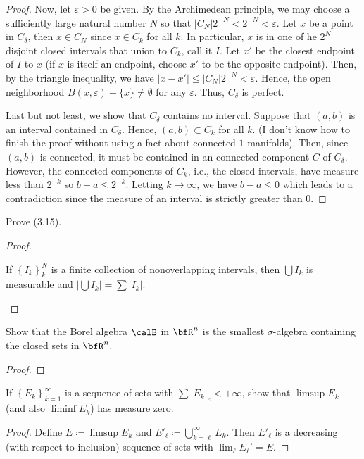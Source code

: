\begin{proof}
Now, let $\varepsilon>0$ be given. By the Archimedean
principle, we may choose a sufficiently large natural number $N$ so that
$\left|C_N\right|2^{-N}<2^{-N}<\varepsilon$. Let $x$ be a point in
$C_\delta$, then $x\in C_N$ since $x\in C_k$ for all $k$. In particular,
$x$ is in one of he $2^N$ disjoint closed intervals that union to $C_k$,
call it $I$. Let $x'$ be the closest endpoint of $I$ to $x$ (if $x$ is
itself an endpoint, choose $x'$ to be the opposite endpoint). Then, by the
triangle inequality, we have $\left|x-x'\right|\leq
\left|C_N\right|2^{-N}<\varepsilon$. Hence, the open neighborhood
$B(x,\varepsilon)\minus\{x\}\neq\emptyset$ for any $\varepsilon$. Thus,
$C_\delta$ is perfect.

Last but not least, we show that $C_\delta$ contains no interval. Suppose
that $(a,b)$ is an interval contained in $C_\delta$. Hence, $(a,b)\subset
C_k$ for all $k$. (I don't know how to finish the proof without using a
fact about connected $1$-manifolds). Then, since $(a,b)$ is connected, it
must be contained in an connected component $C$ of $C_\delta$. However, the
connected components of $C_k$, i.e., the closed intervals, have measure
less than $2^{-k}$ so $b-a\leq 2^{-k}$. Letting $k\to\infty$, we have
$b-a\leq 0$ which leads to a contradiction since the measure of an interval
is strictly greater than $0$.
\end{proof}
\newpage

\begin{problem}
Prove (3.15).
\end{problem}
\begin{proof}
\begin{lemma*}
If $\left\{I_k\right\}_k^N$ is a finite collection of nonoverlapping
intervals, then $\bigcup I_k$ is measurable and $\left|\bigcup
  I_k\right|=\sum\left|I_k\right|$.
\end{lemma*}
\end{proof}
\newpage

\begin{problem}
Show that the Borel algebra $\calB$ in $\bfR^n$ is the smallest
$\sigma$-algebra containing the closed sets in $\bfR^n$.
\end{problem}
\begin{proof}
\end{proof}
\newpage

\begin{problem}
If $\left\{E_k\right\}_{k=1}^\infty$ is a sequence of sets with
$\sum\left|E_k\right|_e<+\infty$, show that $\limsup E_k$ (and
also $\liminf E_k$) has measure zero.
\end{problem}
\begin{proof}
Define $E\coloneqq\limsup E_k$ and $E'_\ell\coloneqq\bigcup_{k=\ell}^\infty
E_k$. Then $E'_\ell$ is a decreasing (with respect to inclusion) sequence
of sets with $\lim_\ell E_\ell'=E$.
\end{proof}
\newpage

